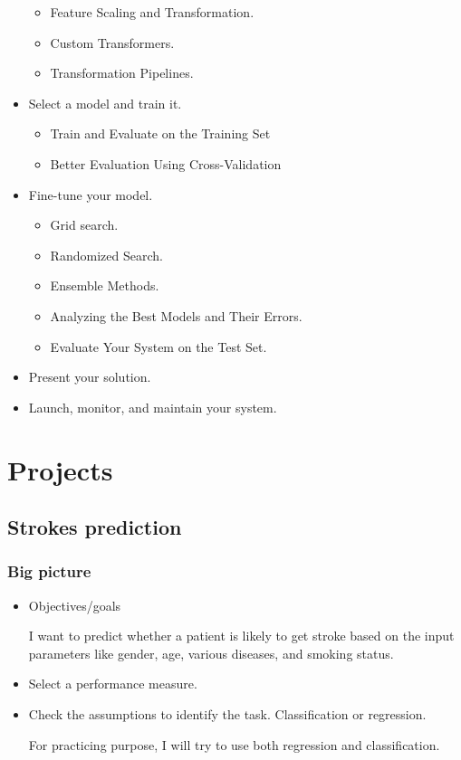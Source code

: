 \documentclass[11pt,a4paper]{article}
\numberwithin{question}{subsection}
\begin{document}
\begin{itemize}
\begin{itemize}
		\item  Feature Scaling and Transformation.
		
		\item  Custom Transformers.
		
		\item  Transformation Pipelines.
	\end{itemize}
	 \item Select a model and train it.
	 \begin{itemize}
	 	\item  Train and Evaluate on the Training Set
	 	
	 	\item   Better Evaluation Using Cross-Validation
	 \end{itemize}
	\item Fine-tune your model.
	\begin{itemize}
		\item Grid search.
		
		\item  Randomized Search.
		
		\item Ensemble Methods.
		
		\item Analyzing the Best Models and Their Errors.
		
		\item Evaluate Your System on the Test Set.
	\end{itemize}
	\item Present your solution.
	
	\item Launch, monitor, and maintain your system.
	
	
\end{itemize}
	
	
	
	\section{Projects }

\subsection{Strokes prediction}
\subsubsection{Big picture}

\begin{itemize}
	\item Objectives/goals
	
	I want to predict whether a patient is likely to get stroke based on the input parameters like gender, age, various diseases, and smoking status. 
	
	\item  Select a performance measure.
	
		\item Check the assumptions to identify the task. Classification or regression.
	
	For practicing purpose, I will try to use both regression and classification.
\end{itemize}
	
\end{document}
